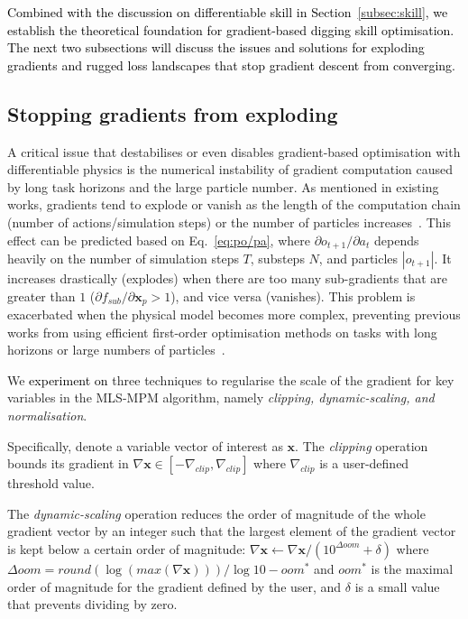 \documentclass[letterpaper, 10 pt, journal, twoside]{ieeetran}
\newcommand{\rp}[1]{\textcolor{black}{#1}}
\newcommand{\rps}[1]{\textcolor{red}{#1}}
\begin{document}
\rp{Combined with the discussion on differentiable skill in Section~\ref{subsec:skill}, we establish the theoretical foundation for gradient-based digging skill optimisation. The next two subsections will discuss the issues and solutions for exploding gradients and rugged loss landscapes that stop gradient descent from converging.}

\subsection{Stopping gradients from exploding}\label{subsec:grad-explode}
A critical issue that destabilises or even disables gradient-based optimisation with differentiable physics is the numerical instability of gradient computation caused by long task horizons and the large particle number. As mentioned in existing works, gradients tend to explode or vanish as the length of the computation chain (number of actions/simulation steps) or the number of particles increases~\cite{xu2021accelerated,lin2022diffskill}. This effect can be predicted based on Eq.~\ref{eq:po/pa}, where $\partial o_{t+1}/\partial a_t$ depends heavily on the number of simulation steps $T$, substeps $N$, and particles $|o_{t+1}|$. It increases drastically (explodes) when there are too many sub-gradients that are greater than $1$ ($\partial f_{sub}/\partial \pmb{x}_p>1$), and vice versa (vanishes). This problem is exacerbated when the physical model becomes more complex, preventing previous works from using efficient first-order optimisation methods on tasks with long horizons or large numbers of particles~\cite{xu2021accelerated,chen2022diffsrl,lin2022diffskill,xian2023fluidlab}. 

We \rp{experiment on} three techniques to regularise the scale of the gradient for key variables in the MLS-MPM algorithm, namely \textit{clipping, dynamic-scaling, and normalisation}. 

Specifically, denote a variable vector of interest as $\pmb{x}$. The \textit{clipping} operation bounds its gradient in $\nabla \pmb{x}\in[-\nabla_{clip}, \nabla_{clip}]$ where $\nabla_{clip}$ is a user-defined threshold value. 

The \textit{dynamic-scaling} operation reduces the order of magnitude of the whole gradient vector by an integer such that the largest element of the gradient vector is kept below a certain order of magnitude: 
$\nabla \pmb{x} \leftarrow \nabla \pmb{x} / (10^{\Delta oom}+\delta)$
where $\Delta oom=round(\log(max(\nabla \pmb{x})))/\log 10 - oom^*$ and $oom^*$ is the maximal order of magnitude for the gradient defined by the user, and $\delta$ is a small value that prevents dividing by zero. 
\end{document}
